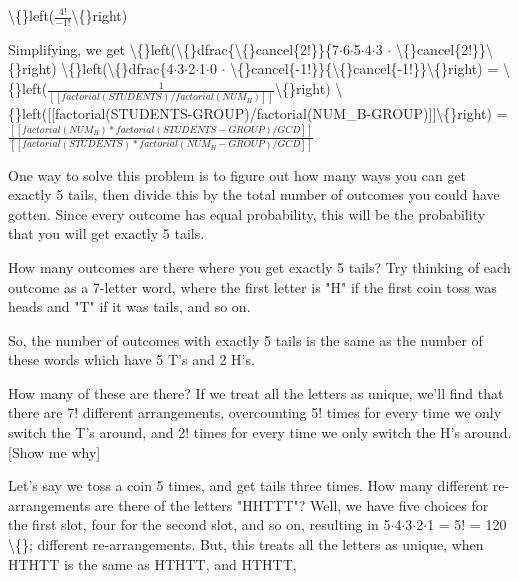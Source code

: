 \documentclass{article}
\begin{document}
\begin{itemize}
{{{{                        \textbackslash\{\}left($\frac{4!}{-1!}$\textbackslash\{\}right)
  \item Simplifying, we get  
                        \textbackslash\{\}left(\textbackslash\{\}dfrac\{\textbackslash\{\}cancel\{2!\}\}\{7$\cdot$6$\cdot$5$\cdot$4$\cdot$3 $\cdot$ \textbackslash\{\}cancel\{2!\}\}\textbackslash\{\}right)
                        \textbackslash\{\}left(\textbackslash\{\}dfrac\{4$\cdot$3$\cdot$2$\cdot$1$\cdot$0 $\cdot$ \textbackslash\{\}cancel\{-1!\}\}\{\textbackslash\{\}cancel\{-1!\}\}\textbackslash\{\}right) = 
                        \textbackslash\{\}left($\frac{1}{[[factorial(STUDENTS)/factorial(NUM_B)]]}$\textbackslash\{\}right)
                        \textbackslash\{\}left([[factorial(STUDENTS-GROUP)/factorial(NUM\_B-GROUP)]]\textbackslash\{\}right) =
                        $\frac{[[factorial(NUM_B)*factorial(STUDENTS-GROUP)/GCD]]}{[[factorial(STUDENTS)*factorial(NUM_B-GROUP)/GCD]]}$
  \item One way to solve this problem is to figure out how many ways you can get exactly 5 tails, then
                        divide this by the total number of outcomes you could have gotten. Since every outcome has equal probability, this will be the 
                        probability that you will get exactly 
                        5 tails.
  \item How many outcomes are there where you get exactly 5 tails? Try thinking of each outcome as 
                        a 7-letter word, where the first letter is "H" if the first coin toss was heads and "T" 
                        if it was tails, and so on.
  \item So, the number of outcomes with exactly 5 tails 
                        is the same as the number of these words which have
                        5 T's and 2 H's.
  \item How many of these are there? If we treat all the letters as unique,
                            we'll find that there are 7! different arrangements, overcounting 5!
                            times for every time we only switch the T's around, and 2!
                            times for every time we only switch the H's around.
                            [Show me why]
                        
                        
                            Let's say we toss a coin 5 times, and get tails three times. How many different re-arrangements are there of the
                            letters "HHTTT"? Well, we have five choices for the first slot, four for the second slot, and so on, resulting in
                            5$\cdot$4$\cdot$3$\cdot$2$\cdot$1 = 5! = 120 \textbackslash\{\}; different re-arrangements. But, this treats all the letters
                            as unique, when 
                            HTHTT 
                            is the same as 
                            HTHTT,
                            and 
                            HTHTT,
                            
}}}}
\end{itemize}
\end{document}
